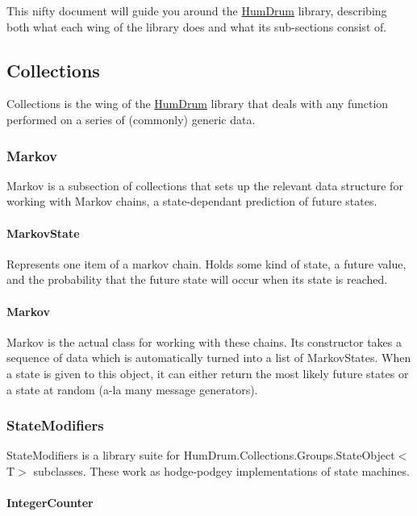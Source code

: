 This nifty document will guide you around the \hyperlink{namespaceHumDrum}{Hum\+Drum} library, describing both what each wing of the library does and what its sub-\/sections consist of.

\subsection*{Collections}

Collections is the wing of the \hyperlink{namespaceHumDrum}{Hum\+Drum} library that deals with any function performed on a series of (commonly) generic data.

\subsubsection*{Markov}

Markov is a subsection of collections that sets up the relevant data structure for working with Markov chains, a state-\/dependant prediction of future states.

\paragraph*{Markov\+State}

Represents one item of a markov chain. Holds some kind of state, a future value, and the probability that the future state will occur when its state is reached.

\paragraph*{Markov}

Markov is the actual class for working with these chains. Its constructor takes a sequence of data which is automatically turned into a list of Markov\+States. When a state is given to this object, it can either return the most likely future states or a state at random (a-\/la many message generators).

\subsubsection*{State\+Modifiers}

State\+Modifiers is a library suite for Hum\+Drum.\+Collections.\+Groups.\+State\+Object$<$\+T$>$ subclasses. These work as hodge-\/podgey implementations of state machines.

\paragraph*{Integer\+Counter}


